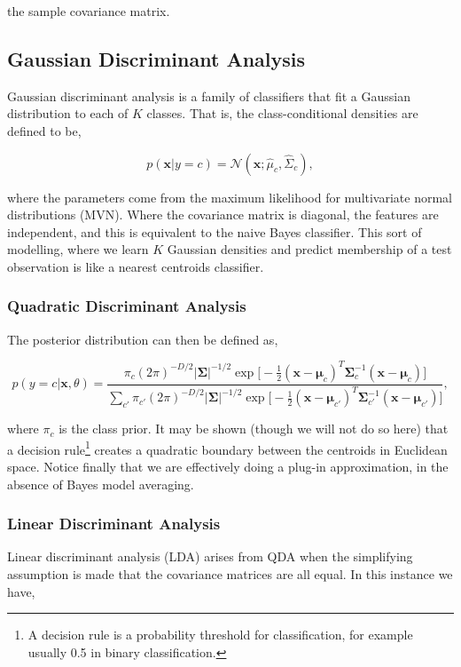 \documentclass[11pt]{amsart}
\begin{document}
the sample covariance matrix.

\subsection{Gaussian Discriminant Analysis}

Gaussian discriminant analysis is a family of classifiers that fit a Gaussian distribution to each of $K$ classes. That is, the class-conditional densities are defined to be,

$$p(\mathbf{x} | y = c) = \mathcal{N}(\mathbf{x} ; \hat{\mu}_c, \hat\Sigma_c),$$

where the parameters come from the maximum likelihood for multivariate normal distributions (MVN). Where the covariance matrix is diagonal, the features are independent, and this is equivalent to the naive Bayes classifier. This sort of modelling, where we learn $K$ Gaussian densities and predict membership of a test observation is like a nearest centroids classifier.

\subsubsection{Quadratic Discriminant Analysis}

The posterior distribution can then be defined as,

$$p(y = c|\mathbf{x}, \theta) = \frac{\pi_c(2\pi)^{-D/2}|\boldsymbol\Sigma|^{-1/2}\exp\big[-\frac{1}{2}(\mathbf{x} - \mathbf{\mu}_c)^T\boldsymbol\Sigma_c^{-1}(\mathbf{x} - \boldsymbol\mu_c)\big]}{\sum_{c'}\pi_{c'}(2\pi)^{-D/2}|\boldsymbol\Sigma|^{-1/2}\exp\big[-\frac{1}{2}(\mathbf{x} - \boldsymbol\mu_{c'})^T\boldsymbol\Sigma_{c'}^{-1}(\mathbf{x} - \boldsymbol\mu_{c'})\big]},$$

where $\pi_c$ is the class prior. It may be shown (though we will not do so here) that a decision rule\footnote{A decision rule is a probability threshold for classification, for example usually 0.5 in binary classification.} creates a quadratic boundary between the centroids in Euclidean space. Notice finally that we are effectively doing a plug-in approximation, in the absence of Bayes model averaging.

\subsubsection{Linear Discriminant Analysis}

Linear discriminant analysis (LDA) arises from QDA when the simplifying assumption is made that the covariance matrices are all equal. In this instance we have,
\end{document}
